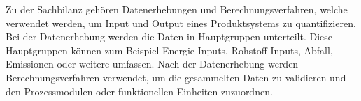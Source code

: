 Zu der Sachbilanz gehören Datenerhebungen und Berechnungsverfahren, welche verwendet werden, um Input und Output eines Produktsystems zu quantifizieren. Bei der Datenerhebung werden die Daten in Hauptgruppen unterteilt. Diese Hauptgruppen können zum Beispiel Energie-Inputs, Rohstoff-Inputs, Abfall, Emissionen oder weitere umfassen. Nach der Datenerhebung werden Berechnungsverfahren verwendet, um die gesammelten Daten zu validieren und den Prozessmodulen oder funktionellen Einheiten zuzuordnen.